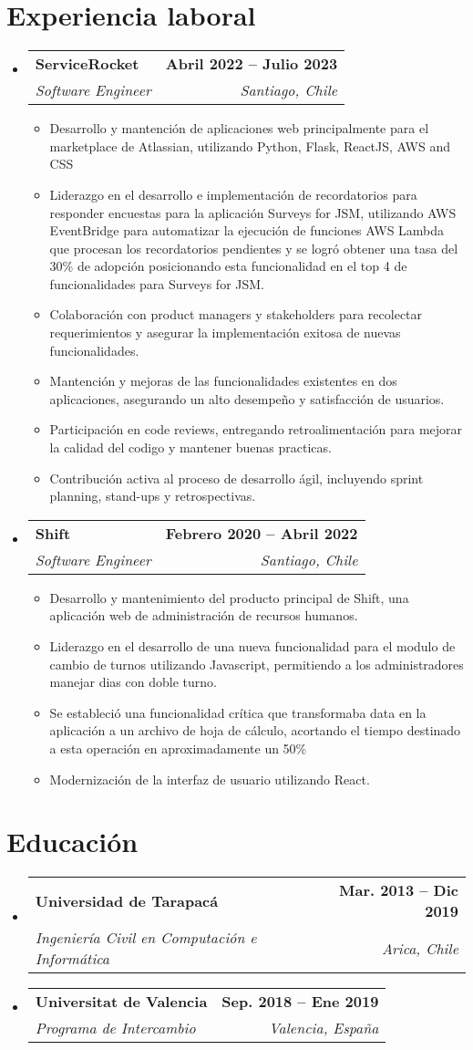 \documentclass[letterpaper,11pt]{article}
\makeatletter
\newcommand{\resumeItem}[1]{
  \item\small{
    {#1 \vspace{-2pt}}
  }
}
\newcommand{\resumeSubheading}[4]{
  \vspace{-2pt}\item
    \begin{tabular*}{1.0\textwidth}[t]{l@{\extracolsep{\fill}}r}
      \textbf{#1} & \textbf{\small #2} \\
      \textit{\small#3} & \textit{\small #4} \\
    \end{tabular*}\vspace{-7pt}
}
\newcommand{\resumeSubHeadingListStart}{\begin{itemize}[leftmargin=0.0in, label={}]}
\newcommand{\resumeSubHeadingListEnd}{\end{itemize}}
\newcommand{\resumeItemListStart}{\begin{itemize}}
\newcommand{\resumeItemListEnd}{\end{itemize}\vspace{-5pt}}
\makeatother
\begin{document}
\section{Experiencia laboral}
  \resumeSubHeadingListStart
    \resumeSubheading
      {ServiceRocket}{Abril 2022 -- Julio 2023}
      {Software Engineer}{Santiago, Chile}
      \resumeItemListStart
        \resumeItem{Desarrollo y mantención de aplicaciones web principalmente para el marketplace de Atlassian, utilizando Python, Flask, ReactJS, AWS and CSS}
        \resumeItem{Liderazgo en el desarrollo e implementación de recordatorios para responder
        encuestas para la aplicación Surveys for JSM, utilizando AWS EventBridge para automatizar
        la ejecución de funciones AWS Lambda que procesan los recordatorios pendientes y se logró
        obtener una tasa del 30\% de adopción posicionando esta funcionalidad en el top 4 de
        funcionalidades para Surveys for JSM.}
        \resumeItem{Colaboración con product managers y stakeholders para recolectar requerimientos y asegurar la implementación exitosa de nuevas funcionalidades.}
        \resumeItem{Mantención y mejoras de las funcionalidades existentes en dos aplicaciones, asegurando un alto desempeño y satisfacción de usuarios.}
        \resumeItem{Participación en code reviews, entregando retroalimentación para mejorar la calidad del codigo y mantener buenas practicas.}
        \resumeItem{Contribución activa al proceso de desarrollo ágil, incluyendo sprint planning, stand-ups y retrospectivas.}
      \resumeItemListEnd
    \resumeSubheading
      {Shift}{Febrero 2020 -- Abril 2022}
      {Software Engineer}{Santiago, Chile}
      \resumeItemListStart
        \resumeItem{Desarrollo y mantenimiento del producto principal de Shift, una aplicación web de administración de recursos humanos.}
        \resumeItem{Liderazgo en el desarrollo de una nueva funcionalidad para el modulo de cambio de turnos utilizando Javascript, permitiendo a los administradores manejar dias con doble turno.}
        \resumeItem{Se estableció una funcionalidad crítica que transformaba data en la aplicación
        a un archivo de hoja de cálculo, acortando el tiempo destinado a esta operación en 
        aproximadamente un 50\%}
        \resumeItem{Modernización de la interfaz de usuario utilizando React.}
      \resumeItemListEnd  
  \resumeSubHeadingListEnd
\vspace{-16pt}


\section{Educación}
  \resumeSubHeadingListStart
    \resumeSubheading
      {Universidad de Tarapacá}{Mar. 2013 -- Dic 2019}
      {Ingeniería Civil en Computación e Informática}{Arica, Chile}
    \resumeSubheading
      {Universitat de Valencia}{Sep. 2018 -- Ene 2019}
      {Programa de Intercambio}{Valencia, España}
  \resumeSubHeadingListEnd
\end{document}
